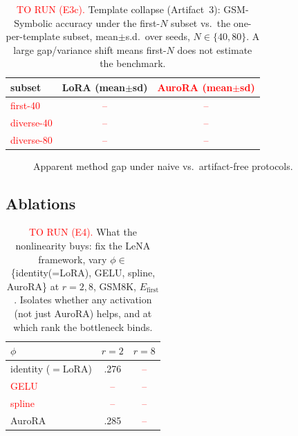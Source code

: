 \documentclass[preprint,11pt]{elsarticle}
\begin{document}
\begin{table}[t]\centering
\caption{\textcolor{red}{TO RUN (E3c).} Template collapse (Artifact~3): GSM-Symbolic accuracy under the first-$N$ subset
vs.\ the one-per-template subset, mean$\pm$s.d.\ over seeds, $N\!\in\!\{40,80\}$. A large gap/variance shift means first-$N$
does not estimate the benchmark.}
\label{tab:template}
\begin{tabular}{lcc}
\toprule
subset & LoRA (mean$\pm$sd) & \textcolor{red}{AuroRA (mean$\pm$sd)}\\
\midrule
\textcolor{red}{first-40}   & \textcolor{red}{--} & \textcolor{red}{--}\\
\textcolor{red}{diverse-40} & \textcolor{red}{--} & \textcolor{red}{--}\\
\textcolor{red}{diverse-80} & \textcolor{red}{--} & \textcolor{red}{--}\\
\bottomrule
\end{tabular}
\end{table}

\begin{figure}[t]\centering
{}
\caption{Apparent method gap under naive vs.\ artifact-free protocols.}
\label{fig:money}
\end{figure}

\subsection{Ablations}
\begin{table}[t]\centering
\caption{\textcolor{red}{TO RUN (E4).} What the nonlinearity buys: fix the LeNA framework, vary $\phi\in$
\{identity(=LoRA), GELU, spline, AuroRA\} at $r{=}2,8$, GSM8K, $E_{\text{first}}$. Isolates whether any activation (not just
AuroRA) helps, and at which rank the bottleneck binds.}
\label{tab:ablate-act}
\begin{tabular}{lcc}
\toprule
$\phi$ & $r{=}2$ & $r{=}8$\\
\midrule
identity ($=$LoRA) & .276 & \textcolor{red}{--}\\
\textcolor{red}{GELU} & \textcolor{red}{--} & \textcolor{red}{--}\\
\textcolor{red}{spline} & \textcolor{red}{--} & \textcolor{red}{--}\\
AuroRA & .285 & \textcolor{red}{--}\\
\bottomrule
\end{tabular}
\end{table}
\end{document}

